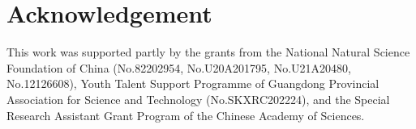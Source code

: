 \documentclass[preprint,review,12pt]{elsarticle}
\begin{document}
\section*{Acknowledgement}
This work was supported partly by the grants from the National Natural Science Foundation of China (No.82202954, No.U20A201795, No.U21A20480, No.12126608), Youth Talent Support Programme of Guangdong Provincial Association for Science and Technology (No.SKXRC202224), and the Special Research Assistant Grant Program of the Chinese Academy of Sciences.

 






\end{document}
